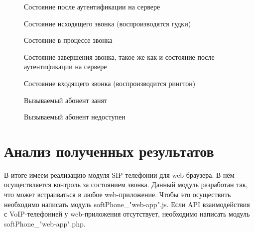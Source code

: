 \begin{figure}[h]
\caption{Состояние после аутентификации на сервере}
\label{image:test2}
\end{figure}

\begin{figure}[h]
\caption{Состояние исходящего звонка (воспроизводятся гудки)}
\label{image:test3}
\end{figure}

\begin{figure}[h]
\caption{Состояние в процессе звонка}
\label{image:test4}
\end{figure}

\begin{figure}[h]
\caption{Состояние завершения звонка, такое же как и состояние после аутентификации на сервере}
\label{image:test5}
\end{figure}

\begin{figure}[h]
\caption{Состояние входящего звонка (воспроизводится рингтон)}
\label{image:test6}
\end{figure}

\begin{figure}[h]
\caption{Вызываемый абонент занят}
\label{image:test7}
\end{figure}

\begin{figure}[h]
\caption{Вызываемый абонент недоступен}
\label{image:test8}
\end{figure}

\section{Анализ полученных результатов}

В итоге имеем реализацию модуля SIP-телефонии для web-браузера. В нём осуществляется контроль за состоянием звонка. Данный модуль разработан так, что может встраиваться в любое web-приложение. Чтобы это осуществить необходимо написать модуль softPhone\_"web-app".js. Если API взаимодействия с VoIP-телефонией у web-приложения отсутствует, необходимо написать модуль softPhone\_"web-app".php.

